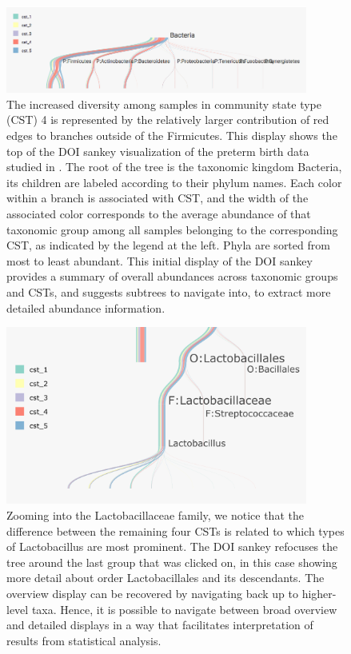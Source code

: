 \begin{figure}

{\centering \includegraphics[width=375px]{figure/treelapse/preterm_csts}

}

\caption{The increased diversity among samples in community state type (CST) 4
  is represented by the relatively larger contribution of red edges to branches
  outside of the Firmicutes. This display shows the top of the DOI sankey
  visualization of the preterm birth data studied in
  \citep{digiulio2015temporal}. The root of the tree is the taxonomic kingdom
  Bacteria, its children are labeled according to their phylum names. Each color
  within a branch is associated with CST, and the width of the associated color
  corresponds to the average abundance of that taxonomic group among all samples
  belonging to the corresponding CST, as indicated by the legend at the left.
  Phyla are sorted from most to least abundant. This initial display of the DOI
  sankey provides a summary of overall abundances across taxonomic groups and
  CSTs, and suggests subtrees to navigate into, to extract more detailed
  abundance information.
}\label{fig:pretermcsts}
\end{figure}

\begin{figure}

{\centering \includegraphics[width=375px]{figure/treelapse/preterm_csts_lacto}

}

\caption{Zooming into the Lactobacillaceae family, we notice that the difference
  between the remaining four CSTs is related to which types of Lactobacillus are
  most prominent. The DOI sankey refocuses the tree around the last group that
  was clicked on, in this case showing more detail about order Lactobacillales
  and its descendants. The overview display can be recovered by navigating back
  up to higher-level taxa. Hence, it is possible to navigate between broad
  overview and detailed displays in a way that facilitates interpretation of
  results from statistical analysis.}\label{fig:pretermcstslacto}
\end{figure}

